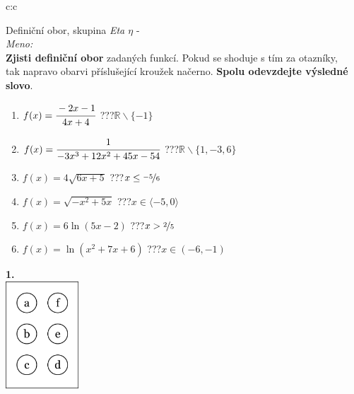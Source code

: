 \documentclass[10pt]{report}
\begin{document}
\begin{tabular}{c:c}
\begin{minipage}[c][99mm][t]{0.49\linewidth}
\begin{center}
\vspace{7mm}
{\huge Definiční obor, skupina \textit{Eta $\eta$} -}\\[4.5mm]
\textit{Meno:}\phantom{xxxxxxxxxxxxxxxxxxxxxxxxxxxxxxxxxxxxxxxxxxxxxxxxxxxxxxxxxxxxxxxxx}\\[3.5mm]
\textbf{Zjisti definiční obor} zadaných funkcí. Pokud se shoduje s tím za otazníky,\\tak napravo obarvi příslušející kroužek načerno. \textbf{Spolu odevzdejte výsledné slovo}.\\[3mm]
\begin{minipage}{0.77\linewidth}
\begin{center}
\begin{varwidth}{\textwidth}
\begin{enumerate}
\normalsize
\item $f(x)=\cfrac{-2x-1}{4x+4}$\quad \dotfill\; ???\;\dotfill \quad $\mathbb{R}\smallsetminus\{-1\}$
\item $f(x)=\cfrac{1}{-3x^3+12x^2+45x-54}$\quad \dotfill\; ???\;\dotfill \quad $\mathbb{R}\smallsetminus\{1,-3,6\}$
\item $f(x)=4\sqrt{6x+5}$\quad \dotfill\; ???\;\dotfill \quad $x\leq\nicefrac{-5}{6}$
\item $f(x)=\sqrt{-x^2+5x}$\quad \dotfill\; ???\;\dotfill \quad $x\in\langle-5 , 0\rangle$
\item $f(x)=6\ln{(5x-2)}$\quad \dotfill\; ???\;\dotfill \quad $x>\nicefrac{2}{5}$
\item $f(x)=\ln{(x^2+7x+6)}$\quad \dotfill\; ???\;\dotfill \quad $x\in(-6 , -1)$
\end{enumerate}
\end{varwidth}
\end{center}
\end{minipage}
\begin{minipage}{0.20\linewidth}
\begin{center}
{\Huge\bfseries 1.} \\[2mm]
\includegraphics[height=40mm]{../images/braille.png}

\end{center}
\end{minipage}
\end{center}
\end{minipage}
\end{tabular}
\end{document}
